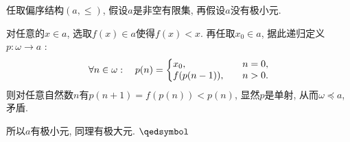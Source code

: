 \documentclass[UTF8]{ctexart}
\begin{document}

任取偏序结构$(a,\leqslant)$, 假设$a$是非空有限集, 再假设$a$没有极小元.

对任意的$x\in a$, 选取$f(x)\in a$使得$f(x)<x$.
再任取$x_0\in a$, 据此递归定义$p:\omega\to a$ :
\vspace{3pt}
\[\forall n\in\omega:\quad p(n)=\left\{\begin{aligned}
    &x_0,\quad&&n=0,\\[-3pt]
    &f(p(n-1)),\quad&&n>0.
\end{aligned}\right.\\[3pt]\]
则对任意自然数$n$有$p(n+1)=f(p(n))<p(n)$, 显然$p$是单射,
从而$\omega\preccurlyeq a$, 矛盾.

所以$a$有极小元, 同理有极大元. \hfill $\qedsymbol$
\end{document}
